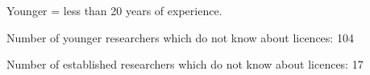 Younger = less than 20 years of experience. 

Number of younger researchers which do not know about licences: 104

Number of established researchers which do not know about licences: 17


